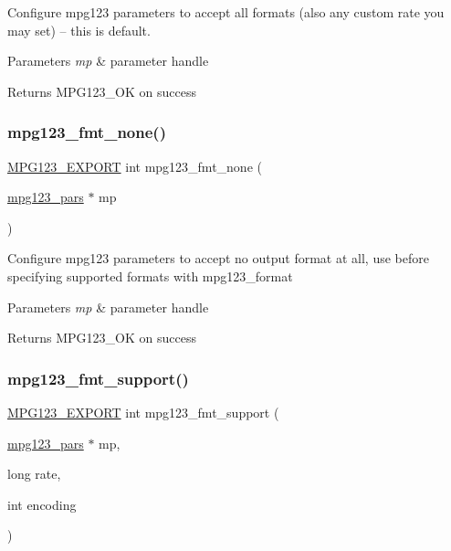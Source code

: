 Configure mpg123 parameters to accept all formats (also any custom rate you may set) -- this is default. 
\begin{DoxyParams}{Parameters}
{\em mp} & parameter handle \\
\hline
\end{DoxyParams}
\begin{DoxyReturn}{Returns}
M\+P\+G123\+\_\+\+OK on success 
\end{DoxyReturn}
\mbox{\label{group__mpg123__advpar_gaf018c28ca2ddcfba5ef7842252ff945a}} 
\subsubsection{\texorpdfstring{mpg123\_fmt\_none()}{mpg123\_fmt\_none()}}
{\footnotesize\ttfamily \mbox{\hyperlink{mpg123_8h_a2ba98cfba3f760879df70e755b2a61cc}{M\+P\+G123\+\_\+\+E\+X\+P\+O\+RT}} int mpg123\+\_\+fmt\+\_\+none (\begin{DoxyParamCaption}\item[{\mbox{\hyperlink{group__mpg123__advpar_ga3983578625af3bb6dc7e3b74d0cab4aa}{mpg123\+\_\+pars}} $\ast$}]{mp }\end{DoxyParamCaption})}

Configure mpg123 parameters to accept no output format at all, use before specifying supported formats with mpg123\+\_\+format 
\begin{DoxyParams}{Parameters}
{\em mp} & parameter handle \\
\hline
\end{DoxyParams}
\begin{DoxyReturn}{Returns}
M\+P\+G123\+\_\+\+OK on success 
\end{DoxyReturn}
\mbox{\label{group__mpg123__advpar_gaa9a70e142d765916977be699c82bc603}} 
\subsubsection{\texorpdfstring{mpg123\_fmt\_support()}{mpg123\_fmt\_support()}}
{\footnotesize\ttfamily \mbox{\hyperlink{mpg123_8h_a2ba98cfba3f760879df70e755b2a61cc}{M\+P\+G123\+\_\+\+E\+X\+P\+O\+RT}} int mpg123\+\_\+fmt\+\_\+support (\begin{DoxyParamCaption}\item[{\mbox{\hyperlink{group__mpg123__advpar_ga3983578625af3bb6dc7e3b74d0cab4aa}{mpg123\+\_\+pars}} $\ast$}]{mp,  }\item[{long}]{rate,  }\item[{int}]{encoding }\end{DoxyParamCaption})}

